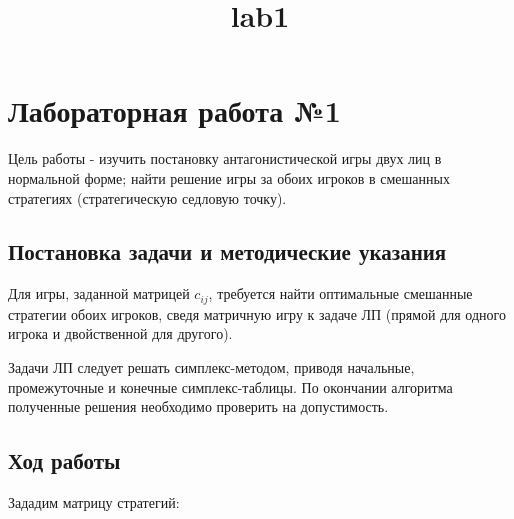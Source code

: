 \documentclass[11pt]{article}
\title{lab1}
\begin{document}
   
    \hypertarget{ux43bux430ux431ux43eux440ux430ux442ux43eux440ux43dux430ux44f-ux440ux430ux431ux43eux442ux430-1}{%
\section{Лабораторная работа
№1}\label{ux43bux430ux431ux43eux440ux430ux442ux43eux440ux43dux430ux44f-ux440ux430ux431ux43eux442ux430-1}}

Цель работы - изучить постановку антагонистической игры двух лиц в
нормальной форме; найти решение игры за обоих игроков в смешанных
стратегиях (стратегическую седловую точку).

\hypertarget{ux43fux43eux441ux442ux430ux43dux43eux432ux43aux430-ux437ux430ux434ux430ux447ux438-ux438-ux43cux435ux442ux43eux434ux438ux447ux435ux441ux43aux438ux435-ux443ux43aux430ux437ux430ux43dux438ux44f}{%
\subsection{Постановка задачи и методические
указания}\label{ux43fux43eux441ux442ux430ux43dux43eux432ux43aux430-ux437ux430ux434ux430ux447ux438-ux438-ux43cux435ux442ux43eux434ux438ux447ux435ux441ux43aux438ux435-ux443ux43aux430ux437ux430ux43dux438ux44f}}

Для игры, заданной матрицей \(c_{ij}\), требуется найти оптимальные
смешанные стратегии обоих игроков, сведя матричную игру к задаче ЛП
(прямой для одного игрока и двойственной для другого).

Задачи ЛП следует решать симплекс-методом, приводя начальные,
промежуточные и конечные симплекс-таблицы. По окончании алгоритма
полученные решения необходимо проверить на допустимость.

    \hypertarget{ux445ux43eux434-ux440ux430ux431ux43eux442ux44b}{%
\subsection{Ход
работы}\label{ux445ux43eux434-ux440ux430ux431ux43eux442ux44b}}

Зададим матрицу стратегий:
\end{document}
